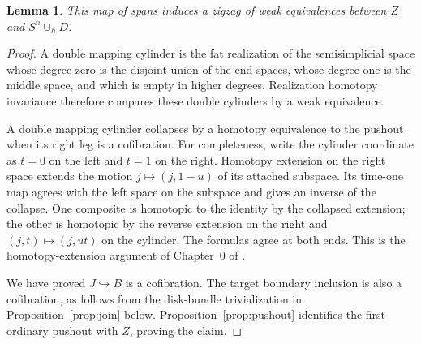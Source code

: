 \documentclass[11pt,a4paper]{article}
\newtheorem{lemma}[theorem]{Lemma}
\theoremstyle{definition}
\begin{document}
\begin{lemma}\label{lem:span}
This map of spans induces a zigzag of weak equivalences between
\(Z\) and \(S^n\cup_h D\).
\end{lemma}
\begin{proof}
A double mapping cylinder is the fat realization of the semisimplicial space whose degree zero is the disjoint union of the end spaces, whose degree one is the middle space, and which is empty in higher degrees. Realization homotopy invariance \cite[Theorem~2.2]{ERW} therefore compares these double cylinders by a weak equivalence.

A double mapping cylinder collapses by a homotopy equivalence to the pushout when its right leg is a cofibration. For completeness, write the cylinder coordinate as \(t=0\) on the left and \(t=1\) on the right. Homotopy extension on the right space extends the motion \(j\mapsto(j,1-u)\) of its attached subspace. Its time-one map agrees with the left space on the subspace and gives an inverse of the collapse. One composite is homotopic to the identity by the collapsed extension; the other is homotopic by the reverse extension on the right and \((j,t)\mapsto(j,ut)\) on the cylinder. The formulas agree at both ends. This is the homotopy-extension argument of Chapter~0 of \cite{Hat}.

We have proved \(J\hookrightarrow B\) is a cofibration. The target boundary inclusion is also a cofibration, as follows from the disk-bundle trivialization in Proposition~\ref{prop:join} below. Proposition~\ref{prop:pushout} identifies the first ordinary pushout with \(Z\), proving the claim.
\end{proof}
\end{document}

